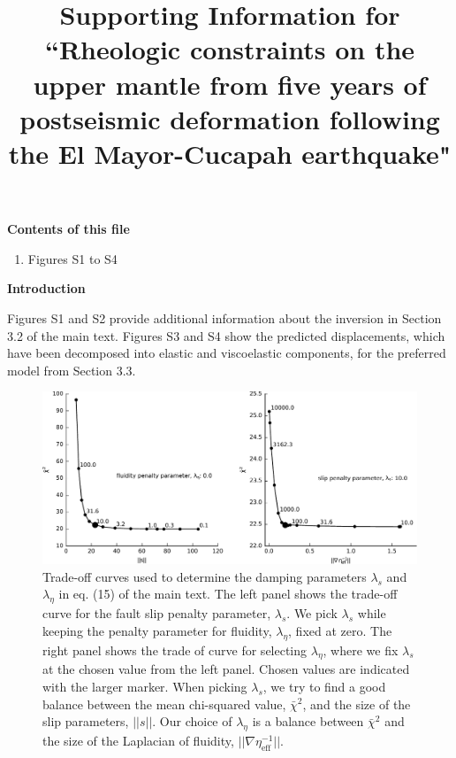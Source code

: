 \documentclass[draft,jgrga]{agutex}
\begin{document}
\title{Supporting Information for ``Rheologic constraints on the upper mantle from five years of postseismic deformation following the El Mayor-Cucapah earthquake"}



\begin{article}

\noindent\textbf{Contents of this file}

\begin{enumerate}
\item Figures S1 to S4
\end{enumerate}
\noindent\textbf{Introduction}

Figures S1 and S2 provide additional information about the inversion in Section 3.2 of the main text. Figures S3 and S4 show the predicted displacements, which have been decomposed into elastic and viscoelastic components, for the preferred model from Section 3.3.  
  
\end{article}
\clearpage

\begin{figure}
\noindent\includegraphics[scale=1.0]{Figures/2016jb013114-fS01}
\caption{
Trade-off curves used to determine the damping parameters $\lambda_s$ and $\lambda_\eta$ in eq. (15) of the main text.  The left panel shows the trade-off curve for the fault slip penalty parameter, $\lambda_s$.  We pick $\lambda_s$ while keeping the penalty parameter for fluidity, $\lambda_\eta$, fixed at zero.  The right panel shows the trade of curve for selecting $\lambda_\eta$, where we fix $\lambda_s$ at the chosen value from the left panel. Chosen values are indicated with the larger marker.  When picking $\lambda_s$, we try to find a good balance between the mean chi-squared value, $\bar{\chi}^2$, and the size of the slip parameters, $||s||$.  Our choice of $\lambda_\eta$ is a balance between $\bar{\chi}^2$ and the size of the Laplacian of fluidity, $||\nabla \eta_\mathrm{eff}^{-1}||$. 
}
\label{fig:S1}
\end{figure}
\end{document}
